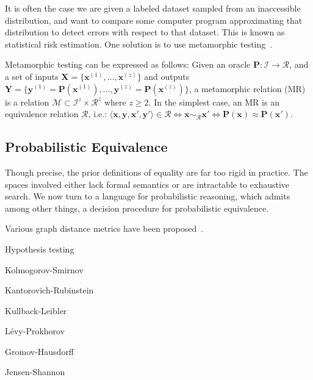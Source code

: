 \documentclass[11pt]{article}
\begin{document}
    It is often the case we are given a labeled dataset sampled from an inaccessible distribution, and want to compare some computer program approximating that distribution to detect errors with respect to that dataset. This is known as statistical risk estimation. One solution is to use metamorphic testing~\cite{chen2020metamorphic}.

    Metamorphic testing can be expressed as follows: Given an oracle $\mathbf P: \mathcal I \rightarrow \mathcal R$, and a set of inputs $\mathbf X = \{\mathbf{x}^{(1)}, \dots, \mathbf{x}^{(z)}\}$ and outputs $\mathbf Y = \{\mathbf{y}^{(1)} = \mathbf{P}(\mathbf{x}^{(1)}), \dots, \mathbf{y}^{(z)} = \mathbf{P}(\mathbf{x}^{(z)})\}$, a metamorphic relation (MR) is a relation $\mathcal M \subset \mathcal I^z \times \mathcal R^z$ where $z \geq 2$. In the simplest case, an MR is an equivalence relation $\mathcal R$, i.e.: $\langle \mathbf x, \mathbf y, \mathbf x', \mathbf y' \rangle \in \mathcal R \Leftrightarrow \mathbf x \sim_{\mathcal R} \mathbf x' \Leftrightarrow \mathbf P(\mathbf x) \approx \mathbf P(\mathbf x')$.

    \pagebreak\subsection{Probabilistic Equivalence}\label{sec:pr-eq}

    Though precise, the prior definitions of equality are far too rigid in practice. The spaces involved either lack formal semantics or are intractable to exhaustive search. We now turn to a language for probabilistic reasoning, which admits among other things, a decision procedure for probabilistic equivalence.



    Various graph distance metrics have been proposed~\cite{sanfeliu1983distance}.

    Hypothesis testing

    Kolmogorov-Smirnov

    Kantorovich-Rubinstein

    Kullback-Leibler

    L\'evy-Prokhorov

    Gromov-Hausdorff

    Jensen-Shannon
\end{document}

